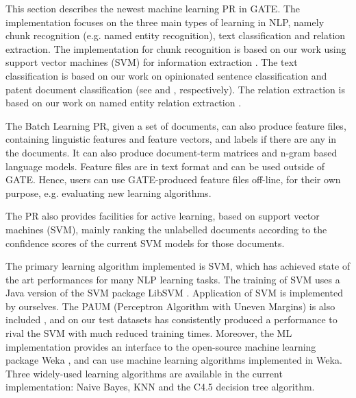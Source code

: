


This section describes the newest machine learning PR in GATE. The
implementation focuses on the three main types of learning in
NLP, namely chunk recognition (e.g. named entity recognition), text
classification and relation extraction.  The implementation for chunk
recognition is based on our work using support vector machines (SVM)
for information extraction \cite{Yaoyong05}. The text classification
is based on our work on opinionated sentence classification and patent
document classification (see \cite{Yaoyong07c} and \cite{Yaoyong07b},
respectively). The relation extraction is based on our work on named
entity relation extraction \cite{Wang06}.

The Batch Learning PR, given a set of documents, can also produce feature
files, containing linguistic features and feature vectors, and labels if there
are any in the documents. It can also produce document-term matrices and n-gram
based language models. Feature files are in text format and can be used outside
of GATE. Hence, users can use GATE-produced feature files off-line, for their own
purpose, e.g. evaluating new learning algorithms.

The PR also provides facilities for active learning, based
on support vector machines (SVM), mainly ranking the unlabelled
documents according to the confidence scores of the current SVM models
for those documents.

The primary learning algorithm implemented is SVM, which has achieved state of
the art performances for many NLP learning tasks. The training of SVM uses a
Java version of the SVM package LibSVM \cite{CC01a}. Application of SVM is
implemented by ourselves. The PAUM (Perceptron Algorithm with Uneven Margins)
is also included \cite{Yaoyong02a}, and on our test datasets has consistently
produced a performance to rival the SVM with much reduced training
times. Moreover, the ML implementation provides an interface to the
open-source machine learning package Weka \cite{Weka}, and can use machine
learning algorithms implemented in Weka. Three widely-used learning algorithms
are available in the current implementation: Naive Bayes, KNN and the C4.5
decision tree algorithm.

